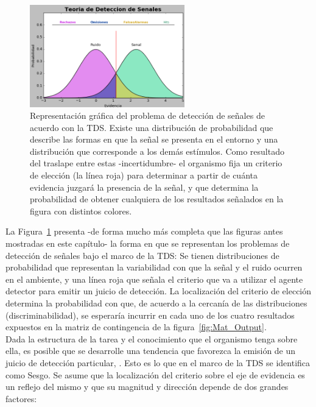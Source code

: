 \begin{figure}[th]
\centering
\includegraphics[width=0.60\textwidth]{Figures/Graficador_Tasas} 
\caption[Posibles Resultados en una Tarea de Detección]{Representación gráfica del problema de detección de señales de acuerdo con la TDS. Existe una distribución de probabilidad que describe las formas en que la señal se presenta en el entorno y una distribución que corresponde a los demás estímulos. Como resultado del traslape entre estas -incertidumbre- el organismo fija un criterio de elección (la línea roja) para determinar a partir de cuánta evidencia juzgará la presencia de la señal, y que determina la probabilidad de obtener cualquiera de los resultados señalados en la figura con distintos colores.}
\label{fig:Graf_Outputs}
\end{figure}

La Figura~\ref{fig:Graf_Outputs} presenta -de forma mucho más completa que las figuras antes mostradas en este capítulo- la forma en que se representan los problemas de detección de señales bajo el marco de la TDS: Se tienen distribuciones de probabilidad que representan la variabilidad con que la señal y el ruido ocurren en el ambiente, \parencite{Tanner1954} y una línea roja que señala el criterio que va a utilizar el agente detector para emitir un juicio de detección. La localización del criterio de elección determina la probabilidad con que, de acuerdo a la cercanía de las distribuciones (discriminabilidad), se esperaría incurrir en cada uno de los cuatro resultados expuestos en la matriz de contingencia de la figura~\ref{fig:Mat_Output}.\\

Dada la estructura de la tarea y el conocimiento que el organismo tenga sobre ella, es posible que se desarrolle una tendencia que favorezca la emisión de un juicio de detección particular, \parencite{Nevin1969}. Esto es lo que en el marco de la TDS se identifica como Sesgo. Se asume que la localización del criterio sobre el eje de evidencia es un reflejo del mismo y que su magnitud y dirección depende de dos grandes factores:\\


